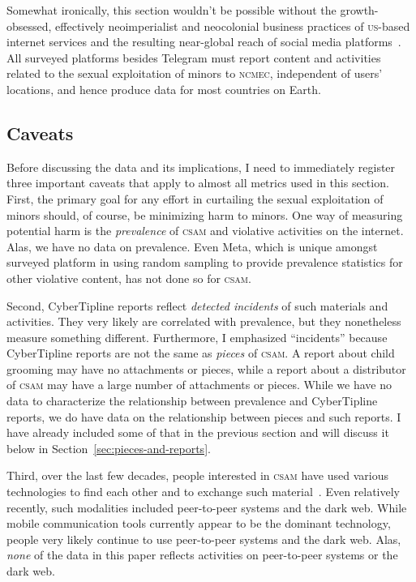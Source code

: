 \documentclass[nonacm,screen]{acmart}
\newcommand\V[1]{\textsc{\MakeLowercase{#1}}}
\begin{document}
Somewhat ironically, this section wouldn't be possible without the
growth-obsessed, effectively neoimperialist and neocolonial business practices
of \V{US}-based internet services and the resulting near-global reach of social
media platforms~\cite{CouldryMejias2019,ThatcherOSullivanea2016}. All surveyed
platforms besides Telegram must report content and activities related to the
sexual exploitation of minors to \V{NCMEC}, independent of users' locations, and
hence produce data for most countries on Earth.


\subsection{Caveats}

Before discussing the data and its implications, I need to immediately register
three important caveats that apply to almost all metrics used in this section.
First, the primary goal for any effort in curtailing the sexual exploitation of
minors should, of course, be minimizing harm to minors. One way of measuring
potential harm is the \emph{prevalence} of \V{CSAM} and violative activities on
the internet. Alas, we have no data on prevalence. Even Meta, which is unique
amongst surveyed platform in using random sampling to provide prevalence
statistics for other violative content, has not done so for \V{CSAM}.

Second, CyberTipline reports reflect \emph{detected incidents} of such materials
and activities. They very likely are correlated with prevalence, but they
nonetheless measure something different. Furthermore, I emphasized ``incidents''
because CyberTipline reports are not the same as \emph{pieces} of \V{CSAM}. A
report about child grooming may have no attachments or pieces, while a report
about a distributor of \V{CSAM} may have a large number of attachments or
pieces. While we have no data to characterize the relationship between
prevalence and CyberTipline reports, we do have data on the relationship between
pieces and such reports. I have already included some of that in the previous
section and will discuss it below in Section~\ref{sec:pieces-and-reports}.

Third, over the last few decades, people interested in \V{CSAM} have used
various technologies to find each other and to exchange such
material~\cite{SteelNewmanea2020}. Even relatively recently, such modalities
included peer-to-peer systems and the dark web. While mobile communication tools
currently appear to be the dominant technology, people very likely continue to
use peer-to-peer systems and the dark web. Alas, \emph{none} of the data in this
paper reflects activities on peer-to-peer systems or the dark web.
\end{document}
